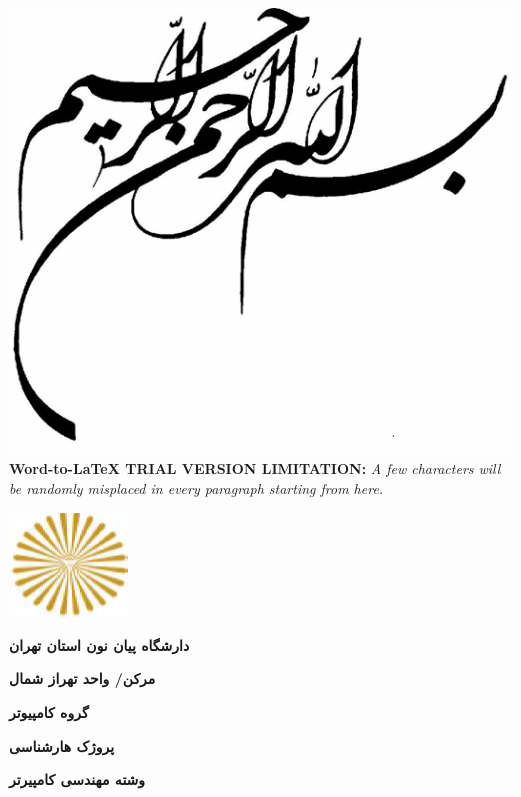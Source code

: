 \documentclass[13pt]{article}
\author{MRT www.Win2Farsi.com}
\title{}
\begin{document}
\pagebreak{}

\includegraphics[width=396pt]{img-6.png}{\LARGE  }
\textbf{Word-to-LaTeX TRIAL VERSION LIMITATION:}\textit{ A few characters will be randomly misplaced in every paragraph starting from here.}
\pagebreak{}

\hspace{15pt}\includegraphics[width=89pt]{img-7.png}{\footnotesize  }
\begin{center}
\textbf{{\LARGE دارشگاه پیان نون استان تهران}}
\end{center}

\begin{center}
\textbf{{\Large مرکن/ واحد تهراز شمال}}
\end{center}

\begin{center}
\textbf{{\large گروه کامپیوتر}}
\end{center}

\begin{center}
\textbf{{\LARGE پروژک هارشناسی}}
\end{center}

\begin{center}
\textbf{{\large وشته مهندسی کامپیرتر}}
\end{center}
\end{document}
